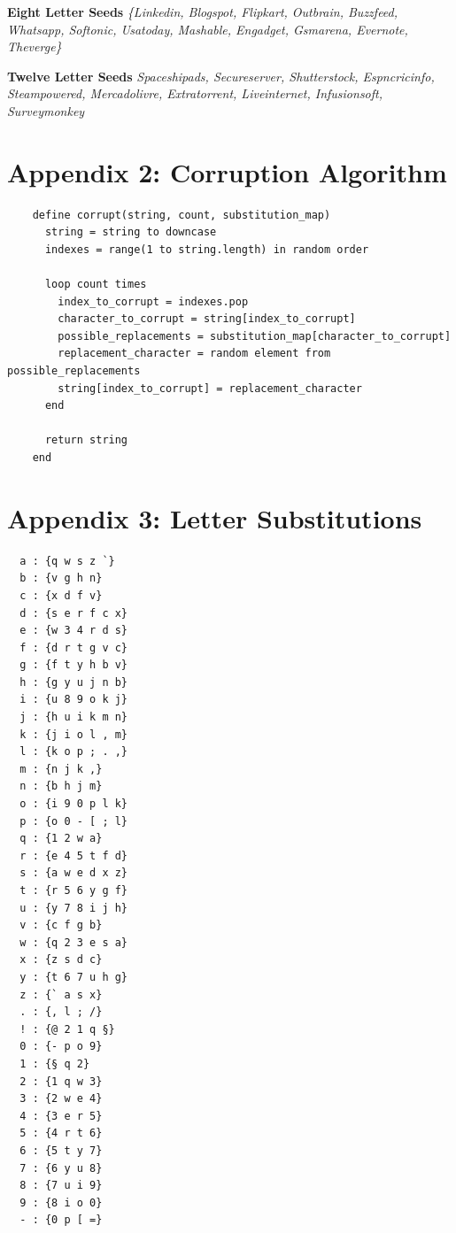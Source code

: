\documentclass{csfourzero}
\begin{document}
\noindent
\textbf{Eight Letter Seeds}
\textit{\{Linkedin, Blogspot, Flipkart, Outbrain, Buzzfeed, Whatsapp, Softonic, Usatoday, Mashable, Engadget, Gsmarena, Evernote, Theverge\}}

\noindent
\textbf{Twelve Letter Seeds}
\textit{{Spaceshipads, Secureserver, Shutterstock, Espncricinfo, Steampowered, Mercadolivre, Extratorrent, Liveinternet, Infusionsoft, Surveymonkey}}

\pagebreak
\raggedbottom
\section{Appendix 2: Corruption Algorithm}
  \begin{verbatim}
    define corrupt(string, count, substitution_map)
      string = string to downcase
      indexes = range(1 to string.length) in random order

      loop count times
        index_to_corrupt = indexes.pop
        character_to_corrupt = string[index_to_corrupt]
        possible_replacements = substitution_map[character_to_corrupt]
        replacement_character = random element from possible_replacements
        string[index_to_corrupt] = replacement_character
      end

      return string
    end
  \end{verbatim}

\pagebreak
\raggedbottom
\section{Appendix 3: Letter Substitutions}
\begin{multicols}{2}
  \begin{verbatim}
  a : {q w s z `}
  b : {v g h n}
  c : {x d f v}
  d : {s e r f c x}
  e : {w 3 4 r d s}
  f : {d r t g v c}
  g : {f t y h b v}
  h : {g y u j n b}
  i : {u 8 9 o k j}
  j : {h u i k m n}
  k : {j i o l , m}
  l : {k o p ; . ,}
  m : {n j k ,}
  n : {b h j m}
  o : {i 9 0 p l k}
  p : {o 0 - [ ; l}
  q : {1 2 w a}
  r : {e 4 5 t f d}
  s : {a w e d x z}
  t : {r 5 6 y g f}
  u : {y 7 8 i j h}
  v : {c f g b}
  w : {q 2 3 e s a}
  x : {z s d c}
  y : {t 6 7 u h g}
  z : {` a s x}
  . : {, l ; /}
  ! : {@ 2 1 q §}
  0 : {- p o 9}
  1 : {§ q 2}
  2 : {1 q w 3}
  3 : {2 w e 4}
  4 : {3 e r 5}
  5 : {4 r t 6}
  6 : {5 t y 7}
  7 : {6 y u 8}
  8 : {7 u i 9}
  9 : {8 i o 0}
  - : {0 p [ =}
  \end{verbatim}
\end{multicols}
\end{document}
